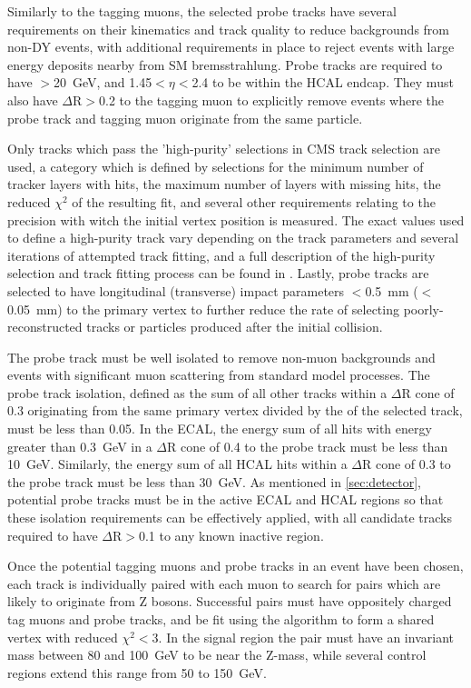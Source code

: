 Similarly to the tagging muons, the selected probe tracks have several requirements on their kinematics and track quality to reduce backgrounds from non-DY events, with additional requirements in place to reject events with large energy deposits nearby from SM bremsstrahlung.
Probe tracks are required to have \pt$>$\SI{20}{\giga\eV}, and 1.45$<\eta<$2.4 to be within the HCAL endcap.
They must also have $\Delta\mathrm{R}>$0.2 to the tagging muon to explicitly remove events where the probe track and tagging muon originate from the same particle.

Only tracks which pass the 'high-purity' selections in CMS track selection are used, a category which is defined by selections for the minimum number of tracker layers with hits, the maximum number of layers with missing hits, the reduced $\chi^2$ of the resulting fit, and several other requirements relating to the precision with witch the initial vertex position is measured.
The exact values used to define a high-purity track vary depending on the track parameters and several iterations of attempted track fitting, and a full description of the high-purity selection and track fitting process can be found in \cite{trackFitting}.
Lastly, probe tracks are selected to have longitudinal (transverse) impact parameters $<$\SI{0.5}{\milli\meter} ($<$\SI{0.05}{\milli\meter}) to the primary vertex to further reduce the rate of selecting poorly-reconstructed tracks or particles produced after the initial collision.

The probe track must be well isolated to remove non-muon backgrounds and events with significant muon scattering from standard model processes. 
The probe track isolation, defined as the \pt sum of all other tracks within a $\Delta$R cone of 0.3 originating from the same primary vertex divided by the \pt of the selected track, must be less than 0.05.
In the ECAL, the energy sum of all hits with energy greater than \SI{0.3}{\giga\eV} in a $\Delta$R cone of 0.4 to the probe track must be less than \SI{10}{\giga\eV}.
Similarly, the energy sum of all HCAL hits within a $\Delta$R cone of 0.3 to the probe track must be less than \SI{30}{\giga\eV}. 
As mentioned in \cref{sec:detector}, potential probe tracks must be in the active ECAL and HCAL regions so that these isolation requirements can be effectively applied, with all candidate tracks required to have $\Delta$R$>$0.1 to any known inactive region.

Once the potential tagging muons and probe tracks in an event have been chosen, each track is individually paired with each muon to search for pairs which are likely to originate from Z bosons.
Successful pairs must have oppositely charged tag muons and probe tracks, and be fit using the \kf algorithm to form a shared vertex with reduced $\chi^2<$3.
In the signal region the pair must have an invariant mass between 80 and \SI{100}{\giga\eV} to be near the Z-mass, while several control regions extend this range from 50 to \SI{150}{\giga\eV}.

